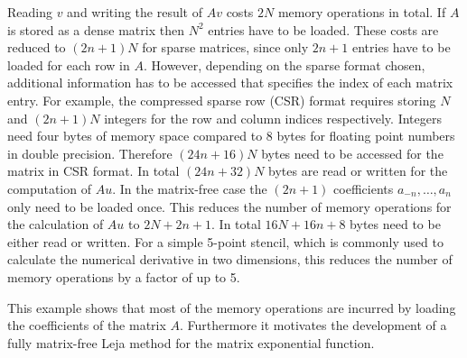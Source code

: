 \documentclass{scrartcl}
\begin{document}

Reading $v$ and writing the result of $Av$ costs $2N$ memory operations in total. If $A$ is stored as a dense matrix then $N^2$ entries have to be loaded. These costs are reduced to $(2n+1)N$ for sparse matrices, since only $2n+1$ entries have to be loaded for each row in $A$. However, depending on the sparse format chosen, additional information has to be accessed that specifies the index of each matrix entry. For example, the compressed sparse row (CSR) format requires storing $N$ and $(2n+1)N$ integers for the row and column indices respectively. Integers need four bytes of memory space compared to 8 bytes for floating point numbers in double precision. Therefore $(24n + 16)N$ bytes need to be accessed for the matrix in CSR format. In total $(24n + 32)N$ bytes are read or written for the computation of $Au$.
In the matrix-free case the $(2n+1)$ coefficients $a_{-n}, \dots, a_{n}$ only need to be loaded once. This reduces the number of memory operations for the calculation of $Au$ to $2N + 2n + 1$. In total $16N + 16n + 8$ bytes need to be either read or written. For a simple 5-point stencil, which is commonly used to calculate the numerical derivative in two dimensions, this reduces the number of memory operations by a factor of up to 5.

This example shows that most of the memory operations are incurred by loading the coefficients of the matrix $A$. Furthermore it motivates the development of a fully matrix-free Leja method for the matrix exponential function. 


\end{document}
